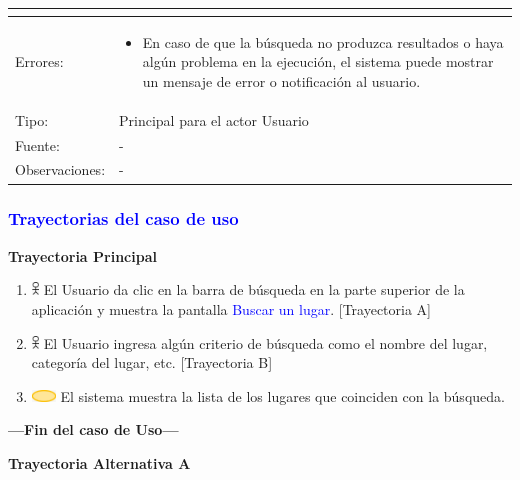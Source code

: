\begin{tabularx}{16cm}{||l|X||}
\begin{itemize}
        \end{itemize}\\
	\hline
	{Errores:} & \begin{itemize}
        \item En caso de que la búsqueda no produzca resultados o haya algún problema en la ejecución, el sistema puede mostrar un mensaje de error o notificación al usuario.
        \end{itemize}\\
	\hline
	{Tipo:} & Principal para el actor Usuario\\
	\hline
	{Fuente:} & {-} \\
	\hline
	{Observaciones:} & {-} \\
	\hline
\end{tabularx}

\subsubsection{\textcolor{blue}{Trayectorias del caso de uso}}

\textbf{Trayectoria Principal}
\begin{enumerate}
    \item \includegraphics[width=0.0150\textwidth]{Figuras/persona.png} El Usuario da clic en la barra de búsqueda en la parte superior de la aplicación y muestra la pantalla \textcolor{blue}{Buscar un lugar}. [Trayectoria A]
    \item \includegraphics[width=0.0150\textwidth]{Figuras/persona.png} El Usuario ingresa algún criterio de búsqueda como el nombre del lugar, categoría del lugar, etc. [Trayectoria B]
    \item \includegraphics[width=0.0500\textwidth]{Figuras/sistema.png} El sistema muestra la lista de los lugares que coinciden con la búsqueda.
\end{enumerate}
\textbf{---Fin del caso de Uso---}
\vspace{15pt}

\textbf{Trayectoria Alternativa A}
\vspace{10pt}

